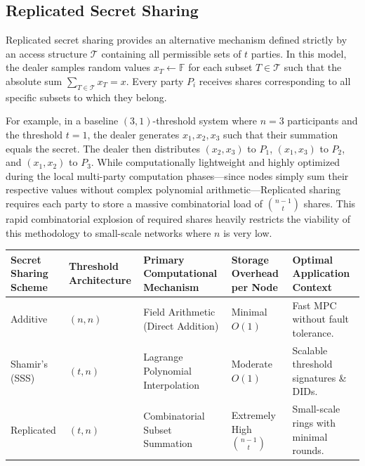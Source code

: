 \documentclass[11pt, a4paper]{article}
\begin{document}
\subsection*{Replicated Secret Sharing}
Replicated secret sharing provides an alternative mechanism defined strictly by an access structure $\mathcal{T}$ containing all permissible sets of $t$ parties. In this model, the dealer samples random values $x_T \leftarrow \mathbb{F}$ for each subset $T \in \mathcal{T}$ such that the absolute sum $\sum_{T \in \mathcal{T}} x_T = x$. Every party $P_i$ receives shares corresponding to all specific subsets to which they belong.

For example, in a baseline $(3, 1)$-threshold system where $n=3$ participants and the threshold $t=1$, the dealer generates $x_1, x_2, x_3$ such that their summation equals the secret. The dealer then distributes $(x_2, x_3)$ to $P_1$, $(x_1, x_3)$ to $P_2$, and $(x_1, x_2)$ to $P_3$. While computationally lightweight and highly optimized during the local multi-party computation phases—since nodes simply sum their respective values without complex polynomial arithmetic—Replicated sharing requires each party to store a massive combinatorial load of $\binom{n-1}{t}$ shares. This rapid combinatorial explosion of required shares heavily restricts the viability of this methodology to small-scale networks where $n$ is very low.

\begin{table}[h!]
\centering
\small
\begin{tabular}{p{2.5cm} p{2cm} p{3.5cm} p{2.5cm} p{3cm}}
\toprule
\textbf{Secret Sharing Scheme} & \textbf{Threshold Architecture} & \textbf{Primary Computational Mechanism} & \textbf{Storage Overhead per Node} & \textbf{Optimal Application Context} \\
\midrule
Additive & $(n, n)$ & Field Arithmetic (Direct Addition) & Minimal $O(1)$ & Fast MPC without fault tolerance. \\
Shamir's (SSS) & $(t, n)$ & Lagrange Polynomial Interpolation & Moderate $O(1)$ & Scalable threshold signatures \& DIDs. \\
Replicated & $(t, n)$ & Combinatorial Subset Summation & Extremely High $\binom{n-1}{t}$ & Small-scale rings with minimal rounds. \\
\bottomrule
\end{tabular}
\end{table}
\end{document}
